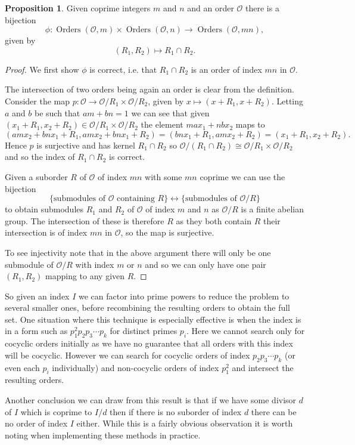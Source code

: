 \documentclass[12pt,a4paper,abstracton,bibtotoc]{scrreprt}
\theoremstyle{definition}
\newtheorem{prop}{Proposition}
\renewcommand{\O}{\mathcal{O}}
\DeclareMathOperator{\Orders}{Orders}
\begin{document}
\begin{prop}
Given coprime integers $m$ and $n$ and an order $\O$ there is a bijection
\[
\phi\colon\Orders(\O,m)\times\Orders(\O,n) \to \Orders(\O,mn),
\]
given by
\[
(R_1,R_2) \mapsto R_1 \cap R_2.
\]
\end{prop}

\begin{proof}
We first show $\phi$ is correct, i.e. that $R_1\cap R_2$ is an order of index $mn$ in $\O$.

The intersection of two orders being again an order is clear from the definition.
Consider the map $p\colon \O \to \O/R_1 \times \O/R_2$, given by $x\mapsto (x+R_1,x+R_2)$.
Letting $a$ and $b$ be such that $am + bn = 1$ we can see that given $(x_1 + R_1,x_2 + R_2)\in \O/R_1 \times \O/R_2$ the element $max_1 + nbx_2$ maps to
\[
(amx_2 + bnx_1 + R_1, amx_2 + bnx_1 + R_2) = (bnx_1 + R_1, amx_2 + R_2) = (x_1 + R_1,x_2 + R_2).
\]
Hence $p$ is surjective and has kernel $R_1 \cap R_2$ so $\O/(R_1\cap R_2) \cong \O/R_1 \times \O/R_2$ and so the index of $R_1 \cap R_2$ is correct.

Given a suborder $R$ of $\O$ of index $mn$ with some $mn$ coprime we can use the bijection
\[
\{\text{submodules of } \O \text{ containing } R\} \leftrightarrow \{\text{submodules of }\O/R\}
\]
to obtain submodules $R_1$ and $R_2$ of $\O$ of index $m$ and $n$ as $\O/R$ is a finite abelian group.
The intersection of these is therefore $R$ as they both contain $R$ their intersection is of index $mn$ in $\O$, so the map is surjective.

To see injectivity note that in the above argument there will only be one submodule of $\O/R$ with index $m$ or $n$ and so we can only have one pair $(R_1,R_2)$ mapping to any given $R$.
\end{proof}

So given an index $I$ we can factor into prime powers to reduce the problem to several smaller ones, before recombining the resulting orders to obtain the full set.
One situation where this technique is especially effective is when the index is in a form such as $p_1^2p_2p_3\cdots p_k$ for distinct primes $p_i$.
Here we cannot search only for cocyclic orders initially as we have no guarantee that all orders with this index will be cocyclic.
However we can search for cocyclic orders of index $p_2p_3\cdots p_k$ (or even each $p_i$ individually) and non-cocyclic orders of index $p_1^2$ and intersect the resulting orders.

Another conclusion we can draw from this result is that if we have some divisor $d$ of $I$ which is coprime to $I/d$ then if there is no suborder of index $d$ there can be no order of index $I$ either.
While this is a fairly obvious observation it is worth noting when implementing these methods in practice.
\end{document}
